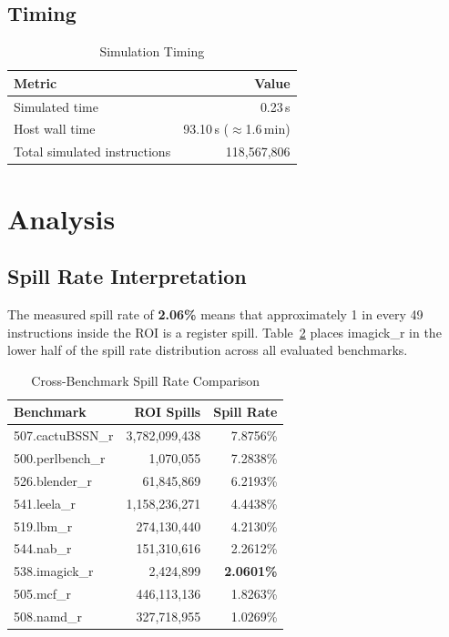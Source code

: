 \documentclass[conference]{IEEEtran}
\begin{document}
\subsection{Timing}

\begin{table}[H]
\centering
\caption{Simulation Timing}
\label{tab:timing}
\begin{tabular}{lr}
\toprule
\textbf{Metric} & \textbf{Value} \\
\midrule
Simulated time           & 0.23\,s \\
Host wall time           & 93.10\,s ($\approx$1.6\,min) \\
Total simulated instructions & 118,567,806 \\
\bottomrule
\end{tabular}
\end{table}

\section{Analysis}

\subsection{Spill Rate Interpretation}

The measured spill rate of \textbf{2.06\%} means that approximately
1 in every 49 instructions inside the ROI is a register spill.
Table~\ref{tab:compare} places imagick\_r in the lower half of the
spill rate distribution across all evaluated benchmarks.

\begin{table}[H]
\centering
\caption{Cross-Benchmark Spill Rate Comparison}
\label{tab:compare}
\begin{tabular}{lrr}
\toprule
\textbf{Benchmark} & \textbf{ROI Spills} & \textbf{Spill Rate} \\
\midrule
507.cactuBSSN\_r & 3,782,099,438 & 7.8756\% \\
500.perlbench\_r &     1,070,055 & 7.2838\% \\
526.blender\_r   &    61,845,869 & 6.2193\% \\
541.leela\_r     & 1,158,236,271 & 4.4438\% \\
519.lbm\_r       &   274,130,440 & 4.2130\% \\
544.nab\_r       &   151,310,616 & 2.2612\% \\
538.imagick\_r   &     2,424,899 & \textbf{2.0601\%} \\
505.mcf\_r       &   446,113,136 & 1.8263\% \\
508.namd\_r      &   327,718,955 & 1.0269\% \\
\bottomrule
\end{tabular}
\end{table}
\end{document}
